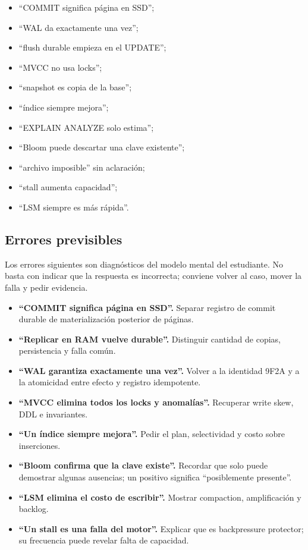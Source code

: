 \documentclass[variant=docente,cover=institutional,mode=screen]{ua-engineering-v6-article}
\begin{document}
\begin{itemize}
\item ``COMMIT significa página en SSD'';
\item ``WAL da exactamente una vez'';
\item ``flush durable empieza en el UPDATE'';
\item ``MVCC no usa locks'';
\item ``snapshot es copia de la base'';
\item ``índice siempre mejora'';
\item ``EXPLAIN ANALYZE solo estima'';
\item ``Bloom puede descartar una clave existente'';
\item ``archivo imposible'' sin aclaración;
\item ``stall aumenta capacidad'';
\item ``LSM siempre es más rápida''.
\end{itemize}

\subsection{Errores previsibles}

Los errores siguientes son diagnósticos del modelo mental del estudiante. No basta con indicar que la respuesta es incorrecta; conviene volver al caso, mover la falla y pedir evidencia.

\begin{itemize}
\item \textbf{``COMMIT significa página en SSD''.} Separar registro de commit durable de materialización posterior de páginas.
\item \textbf{``Replicar en RAM vuelve durable''.} Distinguir cantidad de copias, persistencia y falla común.
\item \textbf{``WAL garantiza exactamente una vez''.} Volver a la identidad 9F2A y a la atomicidad entre efecto y registro idempotente.
\item \textbf{``MVCC elimina todos los locks y anomalías''.} Recuperar write skew, DDL e invariantes.
\item \textbf{``Un índice siempre mejora''.} Pedir el plan, selectividad y costo sobre inserciones.
\item \textbf{``Bloom confirma que la clave existe''.} Recordar que solo puede demostrar algunas ausencias; un positivo significa ``posiblemente presente''.
\item \textbf{``LSM elimina el costo de escribir''.} Mostrar compaction, amplificación y backlog.
\item \textbf{``Un stall es una falla del motor''.} Explicar que es backpressure protector; su frecuencia puede revelar falta de capacidad.
\end{itemize}
\end{document}
